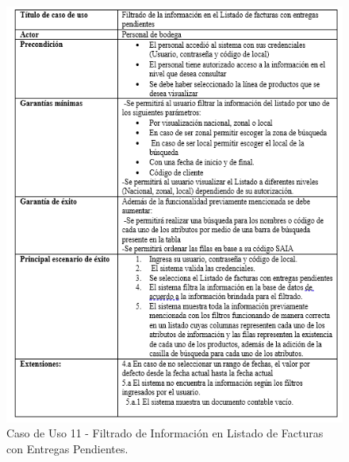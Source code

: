 \documentclass{scrreprt}
\begin{document}
\begin{figure}[!htpb]
    \centerline{\includegraphics[scale=.90]{images/case_stiff/11.png}}
    \caption{Caso de Uso 11 - Filtrado de Información en Listado de Facturas con Entregas Pendientes.}
    \label{fig}
\end{figure}
\FloatBarrier
\end{document}
